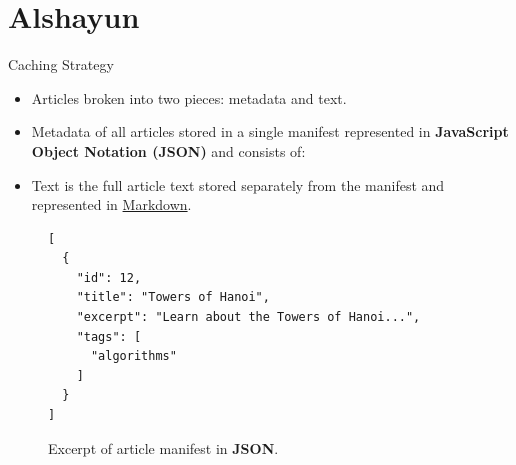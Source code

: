 \documentclass{beamer}
\begin{document}
\section{Alshayun}

\begin{frame}{Caching Strategy}
    \begin{itemize}
        \item Articles broken into two pieces: metadata and text.
        \item Metadata of all articles stored in a single manifest represented
            in \textbf{JavaScript Object Notation (JSON)} and consists of:
        \item Text is the full article text stored separately from the manifest
            and represented in
            \href{https://daringfireball.net/projects/markdown/}{Markdown}.
    \end{itemize}
    \begin{figure}
    \begin{verbatim}
[
  {
    "id": 12,
    "title": "Towers of Hanoi",
    "excerpt": "Learn about the Towers of Hanoi...",
    "tags": [
      "algorithms"
    ]
  }
]
    \end{verbatim}
    \caption{Excerpt of article manifest in \textbf{JSON}.}
    \end{figure}
\end{frame}
\end{document}
